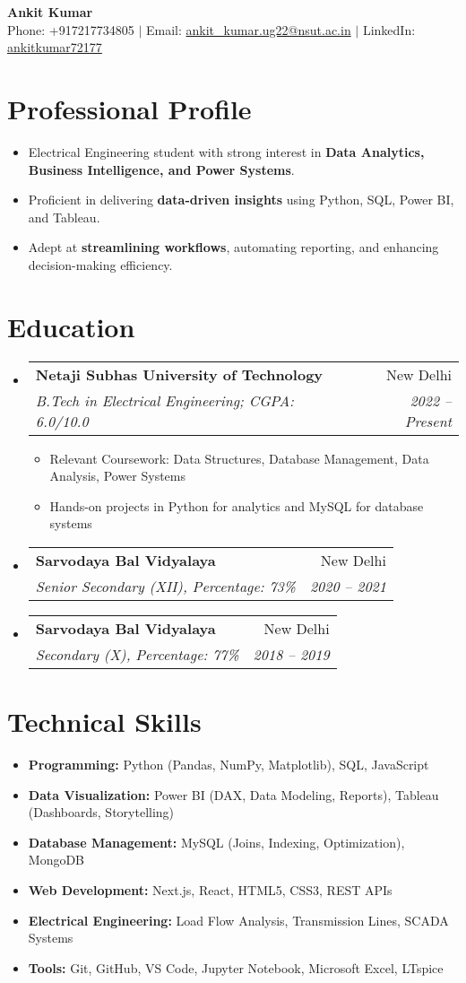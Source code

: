 \documentclass[a4paper,11pt]{article}
\makeatletter
\newcommand{\resumeItem}[1]{
  \item\small{{#1 \vspace{-2pt}}}
}
\newcommand{\resumeSubheading}[4]{
  \vspace{-2pt}\item
  \begin{tabular*}{0.97\textwidth}[t]{l@{\extracolsep{\fill}}r}
    \textbf{#1} & #2 \\
    \textit{\small#3} & \textit{\small #4} \\
  \end{tabular*}\vspace{-7pt}
}
\makeatother
\begin{document}
\begin{center}
    {\Huge \textbf{Ankit Kumar}} \\[8pt]
    \small Phone: +917217734805 $|$
    Email: \href{mailto:ankit_kumar.ug22@nsut.ac.in}{ankit\_kumar.ug22@nsut.ac.in} $|$
    LinkedIn: \href{https://www.linkedin.com/in/ankitkumar72177/}{ankitkumar72177}
\end{center}

\vspace{10pt}

\section*{Professional Profile}
\begin{itemize}[leftmargin=*]
    \resumeItem{Electrical Engineering student with strong interest in \textbf{Data Analytics, Business Intelligence, and Power Systems}.}
    \resumeItem{Proficient in delivering \textbf{data-driven insights} using Python, SQL, Power BI, and Tableau.}
    \resumeItem{Adept at \textbf{streamlining workflows}, automating reporting, and enhancing decision-making efficiency.}
\end{itemize}

\section*{Education}
\begin{itemize}[leftmargin=*]
  \resumeSubheading
    {Netaji Subhas University of Technology}{New Delhi}
    {B.Tech in Electrical Engineering; CGPA: 6.0/10.0}{2022 -- Present}
    \begin{itemize}
        \resumeItem{Relevant Coursework: Data Structures, Database Management, Data Analysis, Power Systems}
        \resumeItem{Hands-on projects in Python for analytics and MySQL for database systems}
    \end{itemize}
  \resumeSubheading
    {Sarvodaya Bal Vidyalaya}{New Delhi}
    {Senior Secondary (XII), Percentage: 73\%}{2020 -- 2021}
  \resumeSubheading
    {Sarvodaya Bal Vidyalaya}{New Delhi}
    {Secondary (X), Percentage: 77\%}{2018 -- 2019}
\end{itemize}

\section*{Technical Skills}
\begin{itemize}[leftmargin=*]
  \resumeItem{\textbf{Programming:} Python (Pandas, NumPy, Matplotlib), SQL, JavaScript}
  \resumeItem{\textbf{Data Visualization:} Power BI (DAX, Data Modeling, Reports), Tableau (Dashboards, Storytelling)}
  \resumeItem{\textbf{Database Management:} MySQL (Joins, Indexing, Optimization), MongoDB}
  \resumeItem{\textbf{Web Development:} Next.js, React, HTML5, CSS3, REST APIs}
  \resumeItem{\textbf{Electrical Engineering:} Load Flow Analysis, Transmission Lines, SCADA Systems}
  \resumeItem{\textbf{Tools:} Git, GitHub, VS Code, Jupyter Notebook, Microsoft Excel, LTspice}
\end{itemize}
\end{document}
